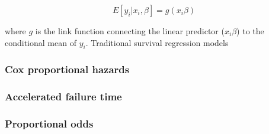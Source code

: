 \documentclass[a4paper]{article}
\begin{document}
  \[
  E[y_i | x_i, \beta] = g(x_i \beta)
  \]
  
  where $g$ is the link function connecting the linear predictor ($x_i \beta$) to the conditional mean of $y_i$. Traditional survival regression models 
  
    \subsubsection{Cox proportional hazards}
    
    \subsubsection{Accelerated failure time}
    
    \subsubsection{Proportional odds}
  
\end{document}
